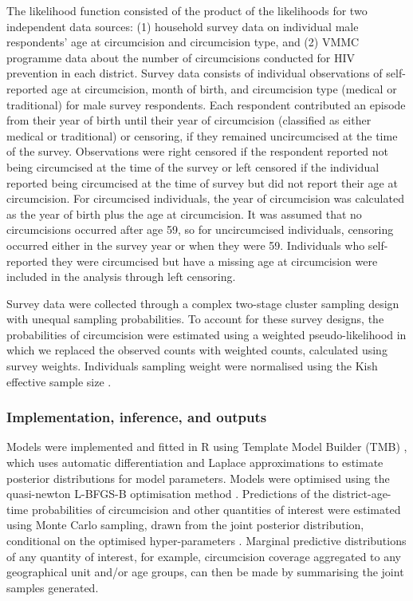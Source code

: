 \documentclass{article}
\begin{document}
The likelihood function consisted of the product of the likelihoods for two independent data sources: (1) household survey data on individual male respondents' age at circumcision and circumcision type, and (2) VMMC programme data about the number of circumcisions conducted for HIV prevention in each district. Survey data consists of individual observations of self-reported age at circumcision, month of birth, and circumcision type (medical or traditional) for male survey respondents. Each respondent contributed an episode from their year of birth until their year of circumcision (classified as either medical or traditional) or censoring, if they remained uncircumcised at the time of the survey. Observations were right censored if the respondent reported not being circumcised at the time of the survey or left censored if the individual reported being circumcised at the time of survey but did not report their age at circumcision. For circumcised individuals, the year of circumcision was calculated as the year of birth plus the age at circumcision. It was assumed that no circumcisions occurred after age 59, so for uncircumcised individuals, censoring occurred either in the survey year or when they were 59. Individuals who self-reported they were circumcised but have a missing age at circumcision were included in the analysis through left censoring.

Survey data were collected through a complex two-stage cluster sampling design with unequal sampling probabilities. To account for these survey designs, the probabilities of circumcision were estimated using a weighted pseudo-likelihood in which we replaced the observed counts with weighted counts, calculated using survey weights. Individuals sampling weight were normalised using the Kish effective sample size \cite{kish1965survey}.


\subsubsection*{Implementation, inference, and outputs}


Models were implemented and fitted in R \cite{rcore} using Template Model Builder (TMB) \cite{kristensen2016tmb}, which uses automatic differentiation and Laplace approximations to estimate posterior distributions for model parameters. Models were optimised using the quasi-newton L-BFGS-B optimisation method \cite{byrd1995limited}. Predictions of the district-age-time probabilities of circumcision and other quantities of interest were estimated using Monte Carlo sampling, drawn from the joint posterior distribution, conditional on the optimised hyper-parameters \cite{eaton2021naomi}. Marginal predictive distributions of any quantity of interest, for example, circumcision coverage aggregated to any geographical unit and/or age groups, can then be made by summarising the joint samples generated.
\end{document}
